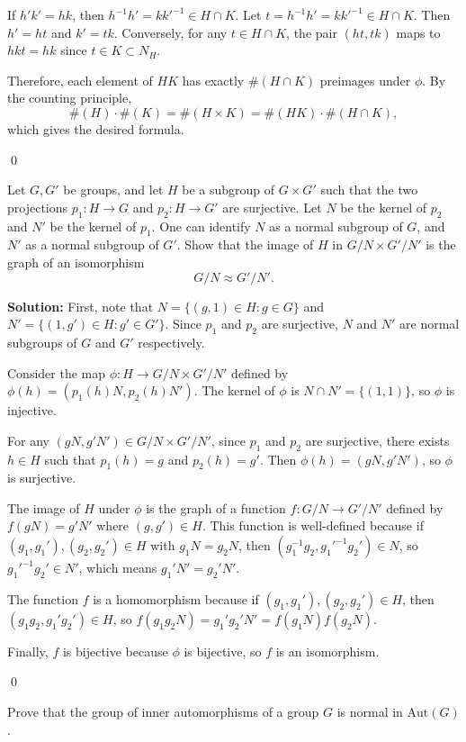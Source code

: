 If $h'k' = hk$, then $h^{-1}h' = kk'^{-1} \in H \cap K$. Let $t = h^{-1}h' = kk'^{-1} \in H \cap K$. Then $h' = ht$ and $k' = tk$. Conversely, for any $t \in H \cap K$, the pair $(ht, tk)$ maps to $hkt = hk$ since $t \in K \subset N_H$.

Therefore, each element of $HK$ has exactly $\#(H \cap K)$ preimages under $\phi$. By the counting principle,
\[\#(H) \cdot \#(K) = \#(H \times K) = \#(HK) \cdot \#(H \cap K),\]
which gives the desired formula.


\qed
\begin{problembox}
Let $G, G'$ be groups, and let $H$ be a subgroup of $G \times G'$ such that the two projections $p_1 : H \rightarrow G$ and $p_2 : H \rightarrow G'$ are surjective. Let $N$ be the kernel of $p_2$ and $N'$ be the kernel of $p_1$. One can identify $N$ as a normal subgroup of $G$, and $N'$ as a normal subgroup of $G'$. Show that the image of $H$ in $G/N \times G'/N'$ is the graph of an isomorphism
\[G/N \approx G'/N'.\]
\end{problembox}

\noindent\textbf{Solution:} First, note that $N = \{(g,1) \in H : g \in G\}$ and $N' = \{(1,g') \in H : g' \in G'\}$. Since $p_1$ and $p_2$ are surjective, $N$ and $N'$ are normal subgroups of $G$ and $G'$ respectively.

Consider the map $\phi: H \to G/N \times G'/N'$ defined by $\phi(h) = (p_1(h)N, p_2(h)N')$. The kernel of $\phi$ is $N \cap N' = \{(1,1)\}$, so $\phi$ is injective.

For any $(gN, g'N') \in G/N \times G'/N'$, since $p_1$ and $p_2$ are surjective, there exists $h \in H$ such that $p_1(h) = g$ and $p_2(h) = g'$. Then $\phi(h) = (gN, g'N')$, so $\phi$ is surjective.

The image of $H$ under $\phi$ is the graph of a function $f: G/N \to G'/N'$ defined by $f(gN) = g'N'$ where $(g,g') \in H$. This function is well-defined because if $(g_1,g_1'), (g_2,g_2') \in H$ with $g_1N = g_2N$, then $(g_1^{-1}g_2, g_1'^{-1}g_2') \in N$, so $g_1'^{-1}g_2' \in N'$, which means $g_1'N' = g_2'N'$.

The function $f$ is a homomorphism because if $(g_1,g_1'), (g_2,g_2') \in H$, then $(g_1g_2, g_1'g_2') \in H$, so $f(g_1g_2N) = g_1'g_2'N' = f(g_1N)f(g_2N)$.

Finally, $f$ is bijective because $\phi$ is bijective, so $f$ is an isomorphism.


\qed
\begin{problembox}
Prove that the group of inner automorphisms of a group $G$ is normal in $\text{Aut}(G)$.
\end{problembox}

